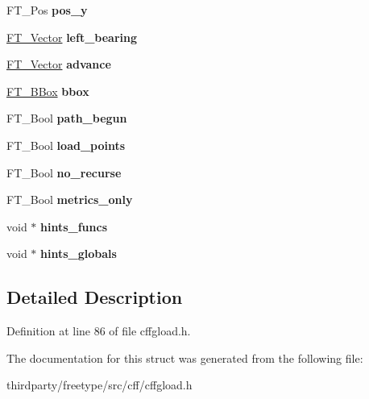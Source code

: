 \begin{DoxyCompactItemize}
F\+T\+\_\+\+Pos {\bfseries pos\+\_\+y}
\item 
\mbox{\label{struct_c_f_f___builder___a1bee78d88325239036b57761fdd0423c}} 
\hyperlink{struct_f_t___vector__}{F\+T\+\_\+\+Vector} {\bfseries left\+\_\+bearing}
\item 
\mbox{\label{struct_c_f_f___builder___a943906425298bbbdc85e7a6d626224b5}} 
\hyperlink{struct_f_t___vector__}{F\+T\+\_\+\+Vector} {\bfseries advance}
\item 
\mbox{\label{struct_c_f_f___builder___a678703f4909900aa2d4c2f6a6e4e2553}} 
\hyperlink{struct_f_t___b_box__}{F\+T\+\_\+\+B\+Box} {\bfseries bbox}
\item 
\mbox{\label{struct_c_f_f___builder___ac8770a979f76c1dc11575dfdf40f1f88}} 
F\+T\+\_\+\+Bool {\bfseries path\+\_\+begun}
\item 
\mbox{\label{struct_c_f_f___builder___abcce85e0ee7ffe37e1cbd3d6cea110c2}} 
F\+T\+\_\+\+Bool {\bfseries load\+\_\+points}
\item 
\mbox{\label{struct_c_f_f___builder___af2637a092e49c57e69a414a79f777743}} 
F\+T\+\_\+\+Bool {\bfseries no\+\_\+recurse}
\item 
\mbox{\label{struct_c_f_f___builder___a649801f2012fc5927cc2647fbb71609d}} 
F\+T\+\_\+\+Bool {\bfseries metrics\+\_\+only}
\item 
\mbox{\label{struct_c_f_f___builder___a7eb0d9144e82e76d6fe4fbd03b678c69}} 
void $\ast$ {\bfseries hints\+\_\+funcs}
\item 
\mbox{\label{struct_c_f_f___builder___a65eb4c3939cd9dc8a176d0f42db20137}} 
void $\ast$ {\bfseries hints\+\_\+globals}
\end{DoxyCompactItemize}


\subsection{Detailed Description}


Definition at line 86 of file cffgload.\+h.



The documentation for this struct was generated from the following file\+:\begin{DoxyCompactItemize}
\item 
thirdparty/freetype/src/cff/cffgload.\+h\end{DoxyCompactItemize}
